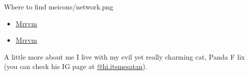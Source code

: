\documentclass{article}
\begin{document}
\begin{purplesectionleft}{Where to find me}{icons/network.png}
{
\begin{itemize}[leftmargin=0cm,align=left]
\item[] \faGithub \hspace*{10pt} \href{https://github.com/mrrvm}{Mrrvm}
\item[] \faLinkedin \hspace*{10pt} \href{https://www.linkedin.com/in/mrrvm/}{Mrrvm}
\end{itemize}
}
\end{purplesectionleft}
\vspace*{29pt}
\begin{aboutme}{A little more about me}
{
I live with my evil yet really charming cat, Panda F lix (you can check his IG page at \href{https://www.instagram.com/hi.itsmesatan/}{@hi.itsmesatan}).
}
\end{aboutme}
\end{document}
